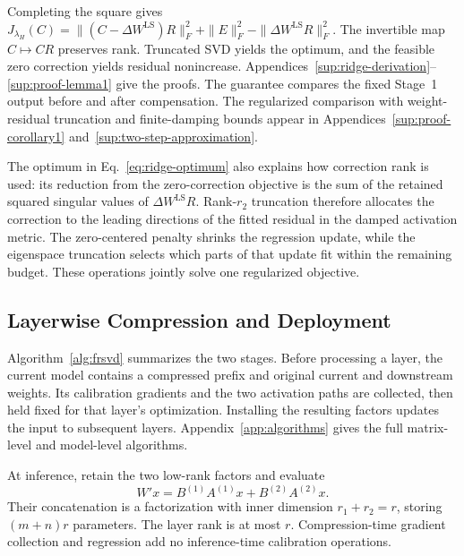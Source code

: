 \documentclass[11pt]{article}
\begin{document}
Completing the square gives $J_{\lambda_H}(C)=\|(C-\Delta W^{\mathrm{LS}})R\|_F^2+\|E\|_F^2-\|\Delta W^{\mathrm{LS}}R\|_F^2$. The invertible map $C\mapsto CR$ preserves rank. Truncated SVD yields the optimum, and the feasible zero correction yields residual nonincrease. Appendices~\ref{sup:ridge-derivation}--\ref{sup:proof-lemma1} give the proofs. The guarantee compares the fixed Stage~1 output before and after compensation. The regularized comparison with weight-residual truncation and finite-damping bounds appear in Appendices~\ref{sup:proof-corollary1} and~\ref{sup:two-step-approximation}.

The optimum in Eq.~\eqref{eq:ridge-optimum} also explains how correction rank is used: its reduction from the zero-correction objective is the sum of the retained squared singular values of $\Delta W^{\mathrm{LS}}R$. Rank-$r_2$ truncation therefore allocates the correction to the leading directions of the fitted residual in the damped activation metric. The zero-centered penalty shrinks the regression update, while the eigenspace truncation selects which parts of that update fit within the remaining budget. These operations jointly solve one regularized objective.

\subsection{Layerwise Compression and Deployment}\label{sec:overall-algo}

Algorithm~\ref{alg:frsvd} summarizes the two stages. Before processing a layer, the current model contains a compressed prefix and original current and downstream weights. Its calibration gradients and the two activation paths are collected, then held fixed for that layer's optimization. Installing the resulting factors updates the input to subsequent layers. Appendix~\ref{app:algorithms} gives the full matrix-level and model-level algorithms.

At inference, retain the two low-rank factors and evaluate
\begin{equation}
W'x=B^{(1)}A^{(1)}x+B^{(2)}A^{(2)}x.
\label{eq:deployment}
\end{equation}
Their concatenation is a factorization with inner dimension $r_1+r_2=r$, storing $(m+n)r$ parameters. The layer rank is at most $r$. Compression-time gradient collection and regression add no inference-time calibration operations.
\end{document}
